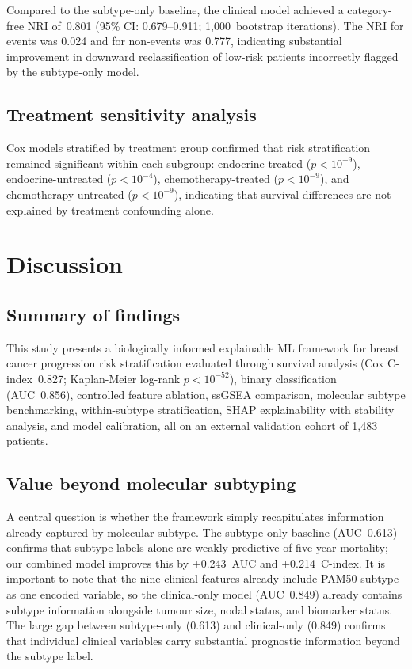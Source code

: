 \documentclass[review,12pt]{elsarticle}
\begin{document}
Compared to the subtype-only baseline, the clinical model achieved
a category-free NRI of~0.801 (95\% CI: 0.679--0.911; 1,000~bootstrap iterations).
The NRI for events was 0.024 and for non-events was 0.777, indicating
substantial improvement in downward reclassification of low-risk patients
incorrectly flagged by the subtype-only model.

\subsection{Treatment sensitivity analysis}
\label{sec:res_treatment}

Cox models stratified by treatment group confirmed that risk
stratification remained significant within each subgroup:
endocrine-treated ($p < 10^{-9}$), endocrine-untreated ($p < 10^{-4}$),
chemotherapy-treated ($p < 10^{-9}$), and chemotherapy-untreated ($p < 10^{-9}$),
indicating that survival differences are not explained by treatment confounding alone.

\section{Discussion}
\label{sec:discussion}

\subsection{Summary of findings}
\label{sec:disc_summary}

This study presents a biologically informed explainable ML framework for
breast cancer progression risk stratification evaluated through survival
analysis (Cox C-index~0.827; Kaplan-Meier log-rank $p < 10^{-52}$),
binary classification (AUC~0.856), controlled feature ablation, ssGSEA
comparison, molecular subtype benchmarking, within-subtype stratification,
SHAP explainability with stability analysis, and model calibration, all
on an external validation cohort of 1,483 patients.

\subsection{Value beyond molecular subtyping}
\label{sec:disc_subtype}

A central question is whether the framework simply recapitulates
information already captured by molecular subtype.  The subtype-only
baseline (AUC~0.613) confirms that subtype labels alone are weakly
predictive of five-year mortality; our combined model improves this by
$+$0.243~AUC and $+$0.214~C-index.  It is important to note that the nine
clinical features already include PAM50 subtype as one encoded variable,
so the clinical-only model (AUC~0.849) already contains subtype
information alongside tumour size, nodal status, and biomarker status.
The large gap between subtype-only (0.613) and clinical-only (0.849)
confirms that individual clinical variables carry substantial prognostic
information beyond the subtype label.
\end{document}
